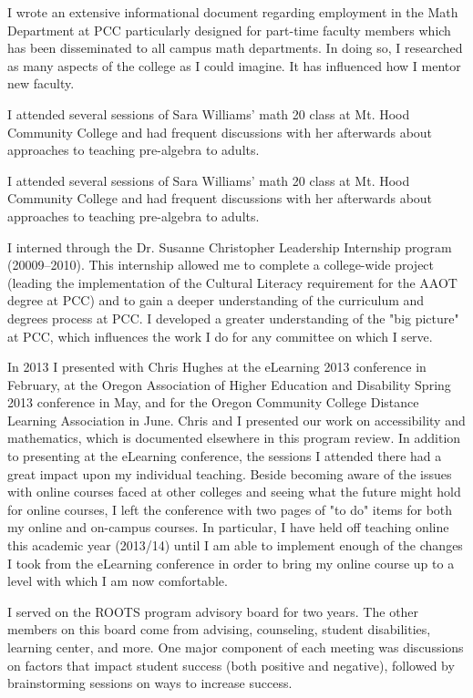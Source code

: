 \begin{description}[style=nextline]
	I wrote an extensive informational document regarding employment in the Math
	Department at PCC particularly designed for part-time faculty members which has
	been disseminated to all campus math departments. In doing so, I researched as
	many aspects of the college as I could imagine. It has influenced how I mentor
	new faculty.

	\item[Jeff Lacks (Full-time Instructor, Sylvania Campus)]
	I attended several sessions of Sara Williams' math 20 class at Mt. Hood
	Community College and had frequent discussions with her afterwards about
	approaches to teaching pre-algebra to adults.

	I attended several sessions of Sara Williams' math 20 class at Mt. Hood
	Community College and had frequent discussions with her afterwards about
	approaches to teaching pre-algebra to adults.

	\item[Scot Leavitt (Full-time Instructor, Sylvania Campus)]
	I interned through the Dr. Susanne Christopher Leadership Internship program
	(20009--2010).  This internship allowed me to complete a college-wide project
	(leading the implementation of the Cultural Literacy requirement for the AAOT
	degree at PCC) and to gain a deeper understanding of the curriculum and degrees
	process at PCC.  I developed a greater understanding of the "big picture" at
	PCC, which influences the work I do for any committee on which I serve.

	In 2013 I presented with Chris Hughes at the eLearning 2013 conference
	in February, at the Oregon Association of Higher Education and Disability
	Spring 2013 conference in May, and for the Oregon Community College Distance
	Learning Association in June.  Chris and I presented our work on accessibility
	and mathematics, which is documented elsewhere in this program review.  In
	addition to presenting at the eLearning conference, the sessions I attended
	there had a great impact upon my individual teaching.  Beside becoming aware of
	the issues with online courses faced at other colleges and seeing what the
	future might hold for online courses, I left the conference with two pages of
	"to do" items for both my online and on-campus courses.  In particular, I have
	held off teaching online this academic year (2013/14) until I am able to
	implement enough of the changes I took from the eLearning conference in order
	to bring my online course up to a level with which I am now comfortable.

	\item[Ronda Lively (Faculty Chair, Sylvania Campus)]
	I served on the ROOTS program advisory board for two years.  The other members
	on this board come from advising, counseling, student disabilities, learning
	center, and more. One major component of each meeting was discussions on
	factors that impact student success (both positive and negative), followed by
	brainstorming sessions on ways to increase success.


\end{description}
